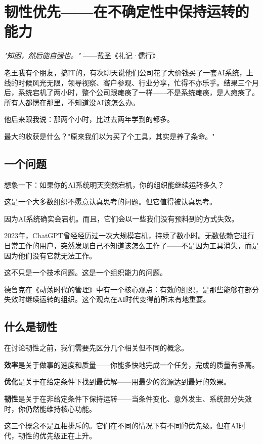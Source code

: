 \chapter{韧性优先——在不确定性中保持运转的能力}


\textit{"知困，然后能自强也。"}
——戴圣《礼记·儒行》


老王我有个朋友，搞IT的，有次聊天说他们公司花了大价钱买了一套AI系统，上线的时候风光无限，领导视察、客户参观、行业分享，忙得不亦乐乎。结果三个月后，系统宕机了两小时，整个公司跟瘫痪了一样——不是系统瘫痪，是人瘫痪了。所有人都愣在那里，不知道没AI该怎么办。

他后来跟我说：那两个小时，比过去两年学到的都多。

最大的收获是什么？"原来我们以为买了个工具，其实是养了条命。"

\section{一个问题}


想象一下：如果你的AI系统明天突然宕机，你的组织能继续运转多久？

这是一个大多数组织不愿意认真思考的问题。但它值得被认真思考。

因为AI系统确实会宕机。而且，它们会以一些我们没有预料到的方式失效。

2023年，ChatGPT曾经经历过一次大规模宕机，持续了数小时。无数依赖它进行日常工作的用户，突然发现自己不知道该怎么工作了——不是因为工具消失，而是因为他们没有它就无法工作。

这不只是一个技术问题。这是一个组织能力的问题。

德鲁克在《动荡时代的管理》中有一个核心观点：有效的组织，是那些能够在部分失效时继续运转的组织。这个观点在AI时代变得前所未有地重要。

\section{什么是韧性}


在讨论韧性之前，我们需要先区分几个相关但不同的概念。

\textbf{效率}是关于做事的速度和质量——你能多快地完成一个任务，完成的质量有多高。

\textbf{优化}是关于在给定条件下找到最优解——用最少的资源达到最好的效果。

\textbf{韧性}是关于在非给定条件下保持运转——当条件变化、意外发生、系统部分失效时，你仍然能维持核心功能。

这三个概念不是互相排斥的。它们在不同的情况下有不同的优先级。但在AI时代，韧性的优先级正在上升。

